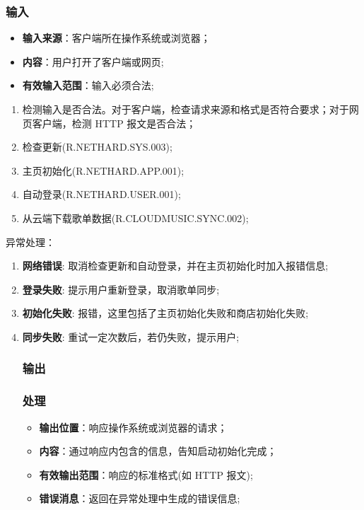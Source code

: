 \subsubsection{输入}
	\begin{itemize}
		\item \textbf{输入来源}：客户端所在操作系统或浏览器；
		\item \textbf{内容}：用户打开了客户端或网页;
		\item \textbf{有效输入范围}：输入必须合法;
	\end{itemize}
\begin{enumerate}
\item 检测输入是否合法。对于客户端，检查请求来源和格式是否符合要求；对于网页客户端，检测 HTTP 报文是否合法；
\item 检查更新(R.NETHARD.SYS.003);
\item 主页初始化(R.NETHARD.APP.001);
\item 自动登录(R.NETHARD.USER.001);
\item 从云端下载歌单数据(R.CLOUDMUSIC.SYNC.002);
\end{enumerate}
\noindent 异常处理：
\begin{enumerate}
\item \textbf{网络错误}: 取消检查更新和自动登录，并在主页初始化时加入报错信息;
\item \textbf{登录失败}: 提示用户重新登录，取消歌单同步;
\item \textbf{初始化失败}: 报错，这里包括了主页初始化失败和商店初始化失败;
  \item \textbf{同步失败}: 重试一定次数后，若仍失败，提示用户;
\subsubsection{输出}
\subsubsection{处理}
\begin{itemize}
	\item \textbf{输出位置}：响应操作系统或浏览器的请求；
	\item \textbf{内容}：通过响应内包含的信息，告知启动初始化完成；
	\item \textbf{有效输出范围}：响应的标准格式(如 HTTP 报文);
	\item \textbf{错误消息}：返回在异常处理中生成的错误信息;
\end{itemize}
\end{enumerate}

